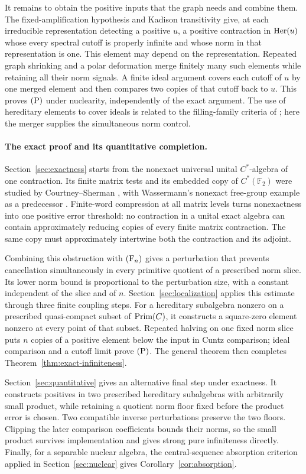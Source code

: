 It remains to obtain the positive inputs that the graph needs and
combine them.  The fixed-amplification hypothesis and Kadison
transitivity \cite{Kadison1957} give, at each irreducible
representation detecting a positive \(u\), a positive contraction in \(\operatorname{Her}(u)\)
whose every spectral cutoff is properly infinite and whose norm in
that representation is one.  This element may
depend on the representation.  Repeated graph shrinking and a polar
deformation merge finitely many such elements while retaining all
their norm signals.  A finite ideal argument covers each cutoff of
\(u\) by one merged element and then compares two copies of that
cutoff back to \(u\).  This proves \(\textup{(P)}\) under nuclearity,
independently of the exact argument.  The use of hereditary elements
to cover ideals is related to the filling-family criteria of
\cite[Theorem~1.1 and Definitions~4.2,~4.7]{KS}; here the merger supplies
the simultaneous norm control.

\paragraph{The exact proof and its quantitative completion.}
Section~\ref{sec:exactness} starts from the nonexact universal unital
\(C^*\)-algebra of one contraction.  Its finite matrix tests and its
embedded copy of \(C^*(\mathbb F_2)\) were studied by
Courtney--Sherman \cite{CS}, with Wassermann's nonexact free-group
example as a predecessor \cite{Wassermann1976}.  Finite-word
compression at all matrix levels turns nonexactness into one positive
error threshold: no contraction in a unital exact algebra can contain
approximately reducing copies of every finite matrix contraction.
The same copy must approximately intertwine both the contraction and
its adjoint.

Combining this obstruction with \(\textup{(F\ensuremath{_n})}\) gives a perturbation that
prevents cancellation simultaneously in every primitive quotient of a
prescribed norm slice.  Its lower norm bound is proportional to the
perturbation size, with a constant independent of the slice and of
\(n\).  Section~\ref{sec:localization} applies this estimate through
three finite coupling steps.  For a hereditary subalgebra nonzero
on a prescribed quasi-compact subset of \(\operatorname{Prim}(C)\), it constructs
a square-zero element nonzero at every point of that subset.  Repeated
halving on one fixed norm slice puts \(n\) copies of a positive
element below the input in Cuntz comparison; ideal comparison and a
cutoff limit prove
\(\textup{(P)}\).  The general theorem then completes
Theorem~\ref{thm:exact-infiniteness}.

Section~\ref{sec:quantitative} gives an alternative final step under
exactness.  It constructs positives in two prescribed hereditary
subalgebras with arbitrarily small product, while retaining a quotient
norm floor fixed before the product error is chosen.  Two compatible
inverse perturbations preserve the two floors.  Clipping the later
comparison coefficients bounds their norms, so the small product
survives implementation and gives strong pure infiniteness directly.
Finally, for a separable nuclear algebra, the central-sequence
absorption criterion applied in Section~\ref{sec:nuclear} gives
Corollary~\ref{cor:absorption}.
